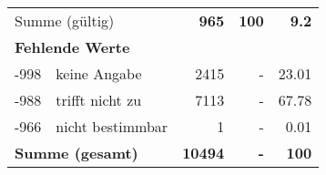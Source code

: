 \begin{longtable}{lXrrr}
     \midrule
     \multicolumn{2}{l}{Summe (gültig)} &
       \textbf{\num{965}} &
     \textbf{100} &
       \textbf{\num[round-mode=places,round-precision=2]{9,2}} \\
     \multicolumn{5}{l}{\textbf{Fehlende Werte}}\\
       -998 &
       keine Angabe &
         \num{2415} &
        - &
         \num[round-mode=places,round-precision=2]{23,01} \\
       -988 &
       trifft nicht zu &
         \num{7113} &
        - &
         \num[round-mode=places,round-precision=2]{67,78} \\
       -966 &
       nicht bestimmbar &
         \num{1} &
        - &
         \num[round-mode=places,round-precision=2]{0,01} \\
     \midrule
     \multicolumn{2}{l}{\textbf{Summe (gesamt)}} &
          \textbf{\num{10494}} &
        \textbf{-} &
        \textbf{100} \\
     \bottomrule
     \end{longtable}
     

